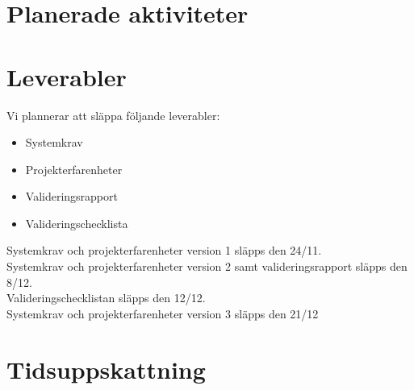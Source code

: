 \documentclass[a4paper]{article}
\begin{document}
	\section{Planerade aktiviteter}

	\section{Leverabler} %
	\label{sec:deliverables}
		Vi plannerar att släppa följande leverabler:
		\begin{itemize}
			\item Systemkrav
			\item Projekterfarenheter
			\item Valideringsrapport
			\item Valideringschecklista
		\end{itemize}
		Systemkrav och projekterfarenheter version 1 släpps den 24/11.\\
		Systemkrav och projekterfarenheter version 2 samt valideringsrapport släpps den 8/12.\\
		Valideringschecklistan släpps den 12/12.\\
		Systemkrav och projekterfarenheter version 3 släpps den 21/12\\ 		

	\section{Tidsuppskattning}
	
\end{document}
